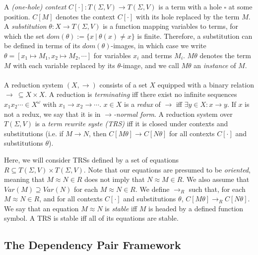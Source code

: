 \documentclass{article}
\begin{document}
A \emph{(one-hole) context} $C[\cdot] : T(\Sigma, V) \rightarrow T(\Sigma, V)$ is a term with a hole $\square$ at some position. $C[M]$ denotes the context $C[\cdot]$ with its hole replaced by the term $M$. A \emph{substitution} $\theta : X \rightarrow T(\Sigma, V)$ is a function mapping variables to terms, for which the set $dom(\theta) := \{ x ~|~ \theta(x) \neq x\}$ is finite. Therefore, a substitution can be defined in terms of its $dom(\theta)$-images, in which case we write $\theta = [x_1 \mapsto M_1, x_2 \mapsto M_2, \cdots]$ for variables $x_i$ and terms $M_i$. $M \theta$ denotes the term $M$ with each variable replaced by its $\theta$-image, and we call $M\theta$ an \emph{instance} of $M$. 
\\~\\
A reduction system $(X, \rightarrow)$ consists of a set $X$ equipped with a binary relation $\rightarrow ~\subseteq X \times X$. A reduction is \emph{terminating} iff there exist no infinite sequences $x_1x_2 \cdots \in X^\omega$ with $x_1 \rightarrow x_2 \rightarrow \cdots$. $x \in X$ is a \emph{redux} of $\rightarrow$ iff $\exists y \in X : x \rightarrow y$. If $x$ is not a redux, we say that it is in \emph{$\rightarrow$-normal form}. A reduction system over $T(\Sigma, V)$ is a \emph{term rewrite syste (TRS)} iff it is closed under contexts and substitutions (i.e. if $M \rightarrow N$, then $C[M\theta] \rightarrow C[N\theta]$ for all contexts $C[\cdot]$ and substitutions $\theta$). 

Here, we will consider TRSs defined by a set of equations $R \subseteq T(\Sigma, V) \times T(\Sigma, V)$. Note that our equations are presumed to be \emph{oriented}, meaning that $M \approx N \in R$ does not imply that $N \approx M \in R$. We also assume that $Var(M) \supseteq Var(N)$ for each $M \approx N \in R$. We define $\rightarrow_R$ such that, for each $M \approx N \in R$, and for all contexts $C[\cdot]$ and substitutions $\theta$, $C[M\theta] \rightarrow_R C[N\theta]$. We say that an equation $M \approx N$ is \emph{stable} iff $M$ is headed by a defined function symbol. A TRS is stable iff all of its equations are stable.  


\subsection{The Dependency Pair Framework}
\end{document}
